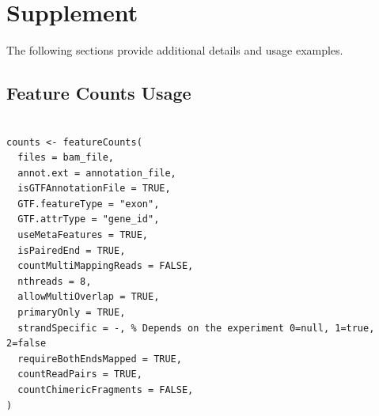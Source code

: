 \documentclass{article}
\begin{document}
    \begin{table}[]
        \centering
        \caption{List of the BAM files provided that have reference solutions with the respective gtf, experiment strandness, and the runtime (excluding GTF Parsing). The BAM files were processed on the bioclient grid (write/read to/from HDD) with -Xmx10g and queued with QueueGridForRefTable.sh}
        \label{tab:reference-bam-runtime}
    \end{table}


    \section{Supplement}
    The following sections provide additional details and usage examples.

    \subsection{Feature Counts Usage}\label{sec:feature-counts-usage}
    \begin{verbatim}

counts <- featureCounts(
  files = bam_file,
  annot.ext = annotation_file,
  isGTFAnnotationFile = TRUE,
  GTF.featureType = "exon",
  GTF.attrType = "gene_id",
  useMetaFeatures = TRUE,
  isPairedEnd = TRUE,
  countMultiMappingReads = FALSE,
  nthreads = 8,
  allowMultiOverlap = TRUE,
  primaryOnly = TRUE,
  strandSpecific = -, % Depends on the experiment 0=null, 1=true, 2=false
  requireBothEndsMapped = TRUE,
  countReadPairs = TRUE,
  countChimericFragments = FALSE,
)
    \end{verbatim}

    \AtNextBibliography{\small}
    \printbibliography
\end{document}
